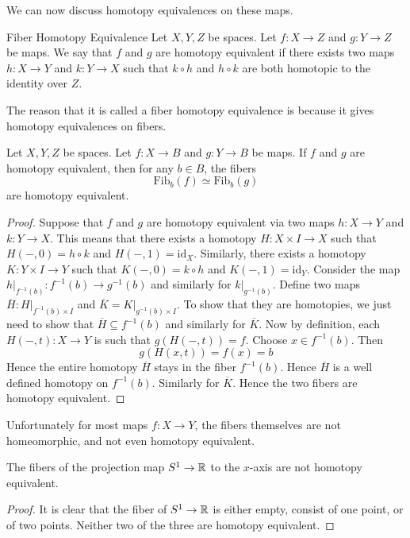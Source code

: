\documentclass[a4paper]{article}
\begin{document}
We can now discuss homotopy equivalences on these maps. 

\begin{defn}{Fiber Homotopy Equivalence}{} Let $X,Y,Z$ be spaces. Let $f:X\to Z$ and $g:Y\to Z$ be maps. We say that $f$ and $g$ are homotopy equivalent if there exists two maps $h:X\to Y$ and $k:Y\to X$ such that $k\circ h$ and $h\circ k$ are both homotopic to the identity over $Z$. 
\end{defn}

The reason that it is called a fiber homotopy equivalence is because it gives homotopy equivalences on fibers. 

\begin{prp}{}{} Let $X,Y,Z$ be spaces. Let $f:X\to B$ and $g:Y\to B$ be maps. If $f$ and $g$ are homotopy equivalent, then for any $b\in B$, the fibers $$\text{Fib}_b(f)\simeq\text{Fib}_b(g)$$ are homotopy equivalent. \tcbline
\begin{proof}
Suppose that $f$ and $g$ are homotopy equivalent via two maps $h:X\to Y$ and $k:Y\to X$. This means that there exists a homotopy $H:X\times I\to X$ such that $H(-,0)=h\circ k$ and $H(-,1)=\text{id}_X$. Similarly, there exists a homotopy $K:Y\times I\to Y$ such that $K(-,0)=k\circ h$ and $K(-,1)=\text{id}_Y$. Consider the map $h|_{f^{-1}(b)}:f^{-1}(b)\to g^{-1}(b)$ and similarly for $k|_{g^{-1}(b)}$. Define two maps $\overline{H}:H|_{f^{-1}(b)\times I}$ and $\overline{K}=K|_{g^{-1}(b)\times I}$. To show that they are homotopies, we just need to show that $\overline{H}\subseteq f^{-1}(b)$ and similarly for $\overline{K}$. Now by definition, each $H(-,t):X\to Y$ is such that $g(H(-,t))=f$. Choose $x\in f^{-1}(b)$. Then $$g(H(x,t))=f(x)=b$$ Hence the entire homotopy $\overline{H}$ stays in the fiber $f^{-1}(b)$. Hence $\overline{H}$ is a well defined homotopy on $f^{-1}(b)$. Similarly for $\overline{K}$. Hence the two fibers are homotopy equivalent. 
\end{proof}
\end{prp}

Unfortunately for most maps $f:X\to Y$, the fibers themselves are not homeomorphic, and not even homotopy equivalent. 

\begin{eg}{}{} The fibers of the projection map $S^1\to\mathbb{R}$ to the $x$-axis are not homotopy equivalent. \tcbline
\begin{proof}
It is clear that the fiber of $S^1\to\mathbb{R}$ is either empty, consist of one point, or of two points. Neither two of the three are homotopy equivalent. 
\end{proof}
\end{eg}
\end{document}
